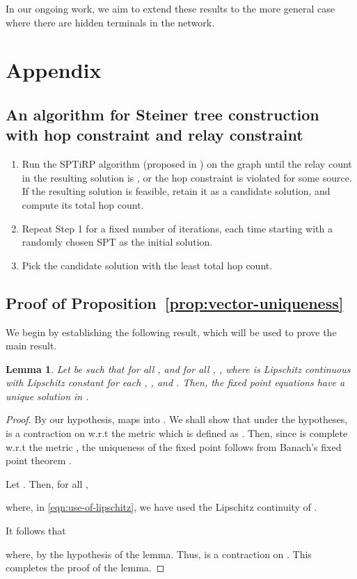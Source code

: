 \documentclass[12pt, draftclsnofoot, onecolumn]{IEEEtran}
\newtheorem{lemma}{Lemma}
\begin{document}
In our ongoing work, we aim to extend these results to the more general case where there are hidden terminals in the network.  

\section{Appendix}
\subsection{An algorithm for Steiner tree construction with hop constraint and relay constraint}

\begin{enumerate}
\item Run the SPTiRP algorithm (proposed in \cite{iwqos}) on the graph  until the relay count in the resulting solution is , or the hop constraint is violated for some source. If the resulting solution is feasible, retain it as a candidate solution, and compute its total hop count.
\item Repeat Step 1 for a fixed number of iterations, each time starting with a randomly chosen SPT as the initial solution. 
\item Pick the candidate solution with the least total hop count. 
\end{enumerate}

\subsection{Proof of Proposition~\ref{prop:vector-uniqueness}}
\label{subsec:proof-vector-uniqueness}
We begin by establishing the following result, which will be used to prove the main result.

\begin{lemma}
\label{lem:uniqueness-lipschitz}
Let  be such that for all , and for all , , where  is Lipschitz continuous with Lipschitz constant  for each , , and . Then, the fixed point equations  have a unique solution in .
\end{lemma}
\begin{proof}
By our hypothesis,  maps  into . We shall show that under the hypotheses,  is a contraction on  w.r.t the metric  which is defined as . Then, since  is complete w.r.t the metric , the uniqueness of the fixed point follows from Banach's fixed point theorem \cite{rudin}.

Let . Then, for all , 

where, in \eqref{eqn:use-of-lipschitz}, we have used the Lipschitz continuity of . 

It follows that 

where,  by the hypothesis of the lemma. Thus,  is a contraction on . This completes the proof of the lemma. 
\end{proof}
\end{document}
